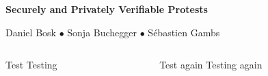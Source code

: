 \begin{center}
  \Huge\bfseries
  Securely and Privately Verifiable Protests
\end{center}
\begin{center}
  \large
  Daniel Bosk $\bullet$ Sonja Buchegger $\bullet$ Sébastien Gambs
\end{center}
\vspace{1.5em}

\begin{columns}

  \begin{column}{0.49\linewidth}

    \begin{block}{Test}
      Testing
    \end{block}

  \end{column}
  \hfill
  \begin{column}{0.49\linewidth}

    \begin{block}{Test again}
      Testing again
    \end{block}

  \end{column}

\end{columns}

